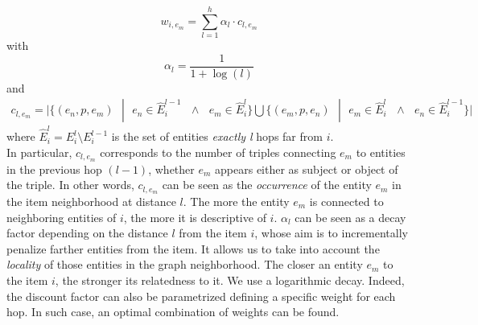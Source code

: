 \[
w_{i,e_m}=\sum \limits_{l=1}^{h} {\alpha_l \cdot c_{l,e_m}}
\] 
with 
\[
\alpha_l =\frac{1}{1+\log(l)}
\]
and
\begin{multline}
c_{l,e_m} = \vert \lbrace  (e_n,p,e_m) \textit{  } | \textit{  } e_n \in \widehat{E}^{l-1}_i \textit{ } \wedge \textit{ } e_m \in \widehat{E}^l_i \rbrace 
 \bigcup \lbrace  (e_m,p,e_n) \textit{  } | \textit{  } e_m \in \widehat{E}^l_i  \textit{ } \wedge \textit{ }  e_n \in \widehat{E}^{l-1}_i \rbrace \vert \nonumber
\end{multline}
where $ \widehat{E}^l_i =  E^l_i \setminus E^{l-1}_i$ is the set of entities \textit{exactly l} hops far from $i$. 
\\In particular, $c_{l,e_m}$ corresponds to the number of triples connecting $e_m$ to entities in the previous hop \textit{$(l-1)$}, whether $e_m$ appears either as subject or object of the triple. In other words, $c_{l,e_m}$ can be seen as the \textit{occurrence} of the entity $e_m$ in the item neighborhood at distance $l$. 
The more the entity $e_m$ is connected to neighboring entities of $i$, the more it is descriptive of $i$. 
$\alpha_l$ can be seen as a decay factor depending on the distance $l$ from the item $i$, whose aim is to incrementally penalize farther entities from the item. It allows us to take into account the \textit{locality} of those entities in the graph neighborhood. The closer an entity $e_m$ to the item $i$, the stronger its relatedness to it. We use a logarithmic decay. 
Indeed, the discount factor can also be parametrized defining a specific weight for each hop. In such case, an optimal combination of weights can be found.

